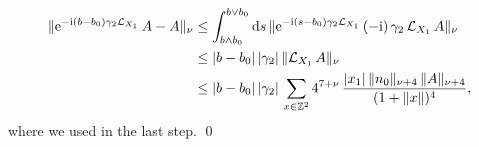 \documentclass[a4paper]{article}
\newcommand{\e}{\mathrm{e}}
\renewcommand{\i}{\mathrm{i}}
\newcommand{\g}{\gamma}
\newcommand{\Z}{\mathbb{Z}}
\newcommand{\mL}{\mathcal{L}}
\newcommand{\dd}{\mathrm{d}}
\DeclarePairedDelimiter\norm{\lVert}{\rVert}
\DeclarePairedDelimiter\abs{\lvert}{\rvert}
\theoremstyle{plain}
\theoremstyle{definition}
\theoremstyle{remark}
\renewcommand{\(}{\left(}
\renewcommand{\)}{\right)}
\begin{document}
    \begin{align*}
        \norm{\e^{-\i (b-b_0) \gamma_2 \mL_{X_1}} \, A -A}_\nu 
        &\leq
        \int_{b\land b_0}^{b \lor b_0} \dd s \,  \norm{\e^{-\i (s-b_0) \gamma_2\mL_{X_1}} \, (-\i) \, \g_2\, \mL_{X_1}\, A }_\nu
        \\
        &\leq
        \abs{b-b_0}\, \abs{\g_2}\,  \norm{\mL_{X_1}\, A }_\nu
        \\
        &\leq \abs{b-b_0}\, \abs{\g_2}\, \sum_{x\in \Z^2} 4^{7+\nu} \, \frac{\abs{x_1} \, \norm{n_0}_{\nu+4} \,\norm{A}_{\nu+4}}{(1+\norm{x})^4}
        ,
    \end{align*}
    where we used \cite[Lemma A.1]{WMMMT24} in the last step.
\qed













\printbibliography
\end{document}

